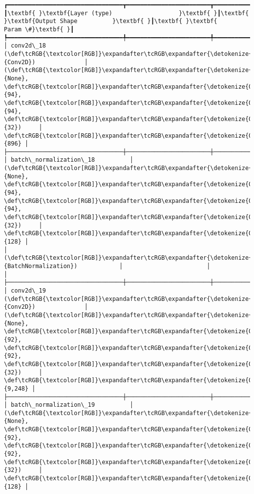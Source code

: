 \documentclass[11pt]{article}
\begin{document}
    \begin{Verbatim}[commandchars=\\\{\}]
┏━━━━━━━━━━━━━━━━━━━━━━━━━━━━━━━━━┳━━━━━━━━━━━━━━━━━━━━━━━━┳━━━━━━━━━━━━━━━┓
┃\textbf{ }\textbf{Layer (type)                   }\textbf{ }┃\textbf{ }\textbf{Output Shape          }\textbf{ }┃\textbf{ }\textbf{      Param \#}\textbf{ }┃
┡━━━━━━━━━━━━━━━━━━━━━━━━━━━━━━━━━╇━━━━━━━━━━━━━━━━━━━━━━━━╇━━━━━━━━━━━━━━━┩
│ conv2d\_18 (\def\tcRGB{\textcolor[RGB]}\expandafter\tcRGB\expandafter{\detokenize{0,135,255}}{Conv2D})              │ (\def\tcRGB{\textcolor[RGB]}\expandafter\tcRGB\expandafter{\detokenize{0,215,255}}{None}, \def\tcRGB{\textcolor[RGB]}\expandafter\tcRGB\expandafter{\detokenize{0,175,0}}{94}, \def\tcRGB{\textcolor[RGB]}\expandafter\tcRGB\expandafter{\detokenize{0,175,0}}{94}, \def\tcRGB{\textcolor[RGB]}\expandafter\tcRGB\expandafter{\detokenize{0,175,0}}{32})     │           \def\tcRGB{\textcolor[RGB]}\expandafter\tcRGB\expandafter{\detokenize{0,175,0}}{896} │
├─────────────────────────────────┼────────────────────────┼───────────────┤
│ batch\_normalization\_18          │ (\def\tcRGB{\textcolor[RGB]}\expandafter\tcRGB\expandafter{\detokenize{0,215,255}}{None}, \def\tcRGB{\textcolor[RGB]}\expandafter\tcRGB\expandafter{\detokenize{0,175,0}}{94}, \def\tcRGB{\textcolor[RGB]}\expandafter\tcRGB\expandafter{\detokenize{0,175,0}}{94}, \def\tcRGB{\textcolor[RGB]}\expandafter\tcRGB\expandafter{\detokenize{0,175,0}}{32})     │           \def\tcRGB{\textcolor[RGB]}\expandafter\tcRGB\expandafter{\detokenize{0,175,0}}{128} │
│ (\def\tcRGB{\textcolor[RGB]}\expandafter\tcRGB\expandafter{\detokenize{0,135,255}}{BatchNormalization})            │                        │               │
├─────────────────────────────────┼────────────────────────┼───────────────┤
│ conv2d\_19 (\def\tcRGB{\textcolor[RGB]}\expandafter\tcRGB\expandafter{\detokenize{0,135,255}}{Conv2D})              │ (\def\tcRGB{\textcolor[RGB]}\expandafter\tcRGB\expandafter{\detokenize{0,215,255}}{None}, \def\tcRGB{\textcolor[RGB]}\expandafter\tcRGB\expandafter{\detokenize{0,175,0}}{92}, \def\tcRGB{\textcolor[RGB]}\expandafter\tcRGB\expandafter{\detokenize{0,175,0}}{92}, \def\tcRGB{\textcolor[RGB]}\expandafter\tcRGB\expandafter{\detokenize{0,175,0}}{32})     │         \def\tcRGB{\textcolor[RGB]}\expandafter\tcRGB\expandafter{\detokenize{0,175,0}}{9,248} │
├─────────────────────────────────┼────────────────────────┼───────────────┤
│ batch\_normalization\_19          │ (\def\tcRGB{\textcolor[RGB]}\expandafter\tcRGB\expandafter{\detokenize{0,215,255}}{None}, \def\tcRGB{\textcolor[RGB]}\expandafter\tcRGB\expandafter{\detokenize{0,175,0}}{92}, \def\tcRGB{\textcolor[RGB]}\expandafter\tcRGB\expandafter{\detokenize{0,175,0}}{92}, \def\tcRGB{\textcolor[RGB]}\expandafter\tcRGB\expandafter{\detokenize{0,175,0}}{32})     │           \def\tcRGB{\textcolor[RGB]}\expandafter\tcRGB\expandafter{\detokenize{0,175,0}}{128} │

\end{Verbatim}
\end{document}
